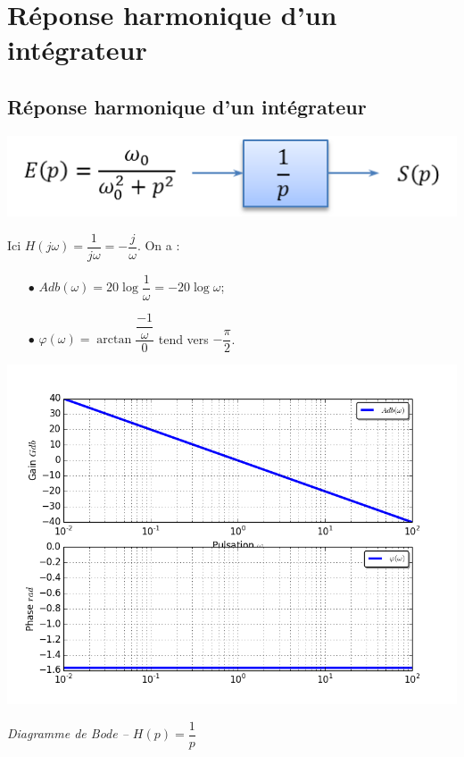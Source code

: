 \documentclass[10pt,oneside]{article}
\begin{document}
\section{Réponse harmonique d'un intégrateur}

\subsection{Réponse harmonique d'un intégrateur}
\begin{minipage}[c]{.48\linewidth}
\begin{center}
\includegraphics[width=.9\textwidth]{png/integrateur_bloc}
\end{center}

Ici $H(j\omega)=\dfrac{1}{j\omega}=-\dfrac{j}{\omega}$. On a :
\begin{itemize}
\item [$\bullet$] $Adb(\omega)=20 \log \dfrac{1}{\omega}=-20\log \omega$;
\item [$\bullet$] $\varphi(\omega)= \arctan \dfrac{\dfrac{-1}{\omega}}{0}$ tend vers $-\dfrac{\pi}{2}$.
\end{itemize}

\end{minipage}\hfill
\begin{minipage}[c]{.48\linewidth}
\begin{center}
\includegraphics[width=.9\textwidth]{png/integrateur_bode}

\textit{Diagramme de Bode -- $H(p)=\dfrac{1}{p}$}
\end{center}
\end{minipage}
\end{document}
